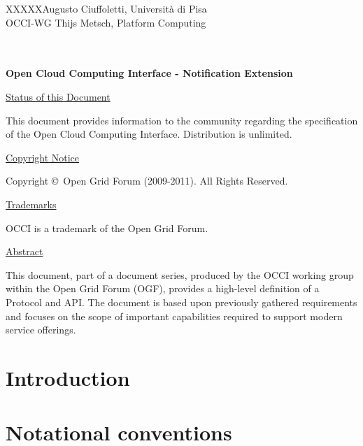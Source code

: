 \documentclass[10pt,a4paper]{article}
\newcommand{\doccode}{XXXXX}
\begin{document}
\thispagestyle{empty}

\doccode \hfill Augusto Ciuffoletti, Università di Pisa\\ 
OCCI-WG \hfill Thijs Metsch, Platform Computing\\
\\
\\

\vspace*{0.5in}

\begin{Large}
\textbf{Open Cloud Computing Interface - Notification Extension}
\end{Large}

\vspace*{0.5in}

\underline{Status of this Document}

This document provides information to the community regarding the
specification of the Open Cloud Computing Interface. Distribution is
unlimited.

\underline{Copyright Notice}

Copyright \copyright ~Open Grid Forum (2009-2011). All Rights Reserved.

\underline{Trademarks}

OCCI is a trademark of the Open Grid Forum.

\underline{Abstract}

This document, part of a document series, produced by the OCCI working
group within the Open Grid Forum (OGF), provides a high-level
definition of a Protocol and API. The document is based upon
previously gathered requirements and focuses on the scope of important
capabilities required to support modern service offerings.


\newpage
\tableofcontents
\newpage

\section{Introduction}


\section{Notational conventions}


\newcommand{\smx}{{\em notifier}}
\newcommand{\ntfl}{{\em notification}}
\end{document}
